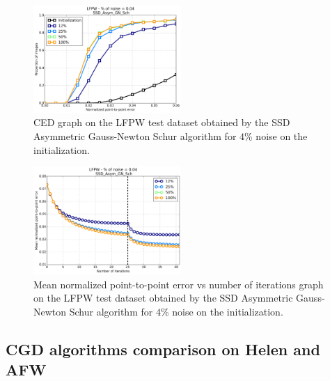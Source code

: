 \begin{figure}[h!]
    \centering
    \includegraphics[width=0.50\textwidth]{experiments/noise_vs_sampling/ssd_asymmetric_gn/ced_ssd_asymmetric_gn_4.png}
    \caption{CED graph on the LFPW test dataset obtained by the SSD Asymmetric Gauss-Newton Schur algorithm for $4$\% noise on the initialization.}
    \label{fig:ced_ssd_asymmetric_gn_4}
\end{figure}

\begin{figure}[h!]
    \centering
    \includegraphics[width=0.50\textwidth]{experiments/noise_vs_sampling/ssd_asymmetric_gn/mean_error_vs_iters_ssd_asymmetric_gn_4.png}
    \caption{Mean normalized point-to-point error vs number of iterations graph on the LFPW test dataset obtained by the SSD Asymmetric Gauss-Newton Schur algorithm for $4$\% noise on the initialization.}
    \label{fig:mean_error_vs_iters_ssd_asymmetric_gn_4}
\end{figure}

\subsection{CGD algorithms comparison on Helen and AFW}






